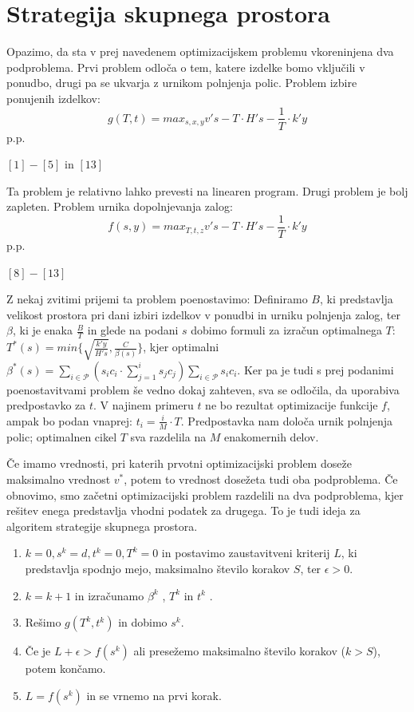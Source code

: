 \documentclass[a4paper]{article}
\begin{document}
\pagebreak
\section{Strategija skupnega prostora}

Opazimo, da sta v prej navedenem optimizacijskem problemu vkoreninjena dva podproblema. Prvi problem odloča o tem, katere izdelke bomo vključili v ponudbo, drugi pa se ukvarja z urnikom polnjenja polic. 
Problem izbire ponujenih izdelkov:
$$g(T, t) = max_{s, x, y}  v' s - T \cdot H' s - \frac{1}{T} \cdot k' y $$
p.p.

$[1] - [5]$ in $[13]$

\vspace*{3 mm}

Ta problem je relativno lahko prevesti na linearen program. Drugi problem je bolj zapleten. 
Problem urnika dopolnjevanja zalog:
$$f(s, y) = max_{T, t, z}  v' s - T \cdot H' s - \frac{1}{T} \cdot k' y $$
p.p.

$[8] - [13]$

\vspace*{3 mm}

Z nekaj zvitimi prijemi ta problem poenostavimo: Definiramo $B$, ki predstavlja velikost prostora pri dani izbiri izdelkov v ponudbi in urniku polnjenja zalog, ter $\beta$, ki je enaka $\frac{B}{T}$ in glede na podani $s$ dobimo formuli za izračun optimalnega $T$: 
$T^{*} (s) = min\{\sqrt{\frac{k' y}{H' s}}, \frac{C}{\beta(s)}  \}$, kjer optimalni $\beta^*  (s) = \sum_{i \in \mathcal{P}} (s_i c_i \cdot \sum_{j = 1}^{i} s_j c_j) \sum_{i \in \mathcal{P}} s_i c_i $. Ker pa je tudi s prej podanimi poenostavitvami problem še vedno dokaj zahteven, sva se odločila, da uporabiva predpostavko za $t$. V najinem primeru $t$ ne bo rezultat optimizacije funkcije $f$, ampak bo podan vnaprej: $t_i = \frac{i}{M}\cdot T$. Predpostavka nam določa urnik polnjenja polic; optimalnen cikel $T$ sva razdelila na $M$ enakomernih delov. 

\vspace*{1 mm}
Če imamo vrednosti, pri katerih prvotni optimizacijski problem doseže maksimalno vrednost $v ^ *$, potem to vrednost dosežeta tudi oba podproblema. Če obnovimo, smo začetni optimizacijski problem razdelili na dva podproblema, kjer rešitev enega predstavlja vhodni podatek za drugega. To je tudi ideja za algoritem strategije skupnega prostora.

\begin{enumerate}
\item $k = 0, s^k = d, t^k = 0, T^k = 0$ in postavimo zaustavitveni kriterij $L$, ki predstavlja spodnjo mejo, maksimalno število korakov $S$, ter $\epsilon > 0$.
\item $k = k+1$ in izračunamo  $\beta^k$ , $T^k$ in $t^k$ .
\item Rešimo $g(T^k, t^k)$ in dobimo $s^k$.
\item Če je $L  + \epsilon> f(s^k)$ ali  presežemo maksimalno število korakov ($k > S$), potem končamo.
\item $L = f(s^k)$ in se vrnemo na prvi korak.
\end{enumerate}
\end{document}
